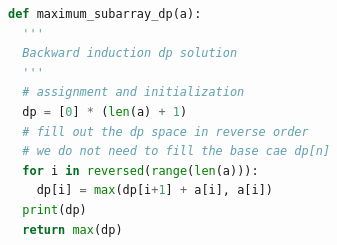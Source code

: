 \documentclass[../main.tex]{subfiles}
\begin{document}
\begin{enumerate}
\begin{lstlisting}[language = Python]
def maximum_subarray_dp(a):
  '''
  Backward induction dp solution
  '''
  # assignment and initialization
  dp = [0] * (len(a) + 1)
  # fill out the dp space in reverse order
  # we do not need to fill the base cae dp[n]
  for i in reversed(range(len(a))):
    dp[i] = max(dp[i+1] + a[i], a[i])
  print(dp)
  return max(dp)
\end{lstlisting}
\end{enumerate}


\end{document}
